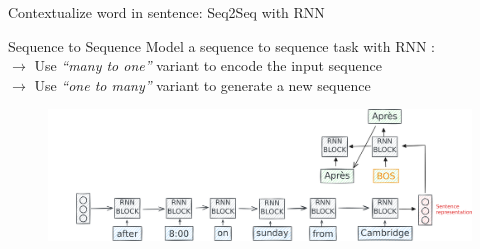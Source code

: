 \documentclass[10pt,aspectratio=169]{beamer}
\begin{document}
  \begin{frame}[noframenumbering]{Contextualize word in sentence: Seq2Seq with RNN}

    \begin{block}{Sequence to Sequence}
      \vspace{.1cm}
      {\footnotesize
        Model a sequence to sequence task with RNN :\\ 
        $\rightarrow $ Use \textit{``many to one''} variant to encode the input sequence\\
        $\rightarrow $ Use \textit{``one to many''} variant to generate a new sequence\\
      } 
    \end{block}

    \begin{figure}
      \centering
      \includegraphics[width=1.\textwidth]{img/RNN-example-seq2seq-5.pdf}
    \end{figure}


  \end{frame}
\end{document}
